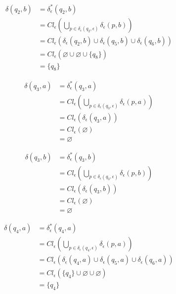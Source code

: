 \documentclass{article}
\begin{document}
\begin{enumerate}
{\begin{enumerate}
{					\begin{align*}
						\delta(q_{2}, b) &= \delta^{*}_{\epsilon}(q_{2}, b) \\
						&= Cl_{\epsilon}(\bigcup_{p \in \delta_{\epsilon}(q_{2}, \epsilon)}
						{\delta_{\epsilon}(p, b)}) \\
						&= Cl_{\epsilon}(\delta_{\epsilon}(q_{2}, b) 
						\cup \delta_{\epsilon}(q_{5}, b)
						\cup \delta_{\epsilon}(q_{6}, b))\\
						&= Cl_{\epsilon}(\varnothing \cup \varnothing \cup \{q_{8}\})\\
						&= \{q_{8}\}
					\end{align*}

					\begin{align*}
						\delta(q_{3}, a) &= \delta^{*}_{\epsilon}(q_{3}, a) \\
						&= Cl_{\epsilon}(\bigcup_{p \in \delta_{\epsilon}(q_{3}, \epsilon)}
						{\delta_{\epsilon}(p, a)}) \\
						&= Cl_{\epsilon}(\delta_{\epsilon}(q_{3}, a))\\
						&= Cl_{\epsilon}(\varnothing)\\
						&= \varnothing
					\end{align*}

					\begin{align*}
						\delta(q_{3}, b) &= \delta^{*}_{\epsilon}(q_{3}, b) \\
						&= Cl_{\epsilon}(\bigcup_{p \in \delta_{\epsilon}(q_{3}, \epsilon)}
						{\delta_{\epsilon}(p, b)}) \\
						&= Cl_{\epsilon}(\delta_{\epsilon}(q_{3}, b))\\
						&= Cl_{\epsilon}(\varnothing)\\
						&= \varnothing
					\end{align*}

					\begin{align*}
						\delta(q_{4}, a) &= \delta^{*}_{\epsilon}(q_{4}, a) \\
						&= Cl_{\epsilon}(\bigcup_{p \in \delta_{\epsilon}(q_{4}, \epsilon)}
						{\delta_{\epsilon}(p, a)}) \\
						&= Cl_{\epsilon}(\delta_{\epsilon}(q_{4}, a) 
						\cup \delta_{\epsilon}(q_{5}, a)
						\cup \delta_{\epsilon}(q_{6}, a))\\
						&= Cl_{\epsilon}(\{q_{4}\} \cup \varnothing \cup \varnothing)\\
						&= \{q_{4}\}
					\end{align*}

}
\end{enumerate}}
\end{enumerate}
\end{document}
